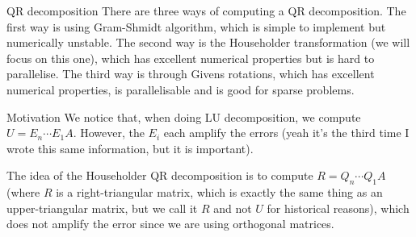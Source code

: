 \documentclass[a4paper]{article}
\begin{document}
\begin{parag}{QR decomposition}
    There are three ways of computing a QR decomposition. The first way is using Gram-Shmidt algorithm, which is simple to implement but numerically unstable. The second way is the Householder transformation (we will focus on this one), which has excellent numerical properties but is hard to parallelise. The third way is through Givens rotations, which has excellent numerical properties, is parallelisable and is good for sparse problems.
\end{parag}

\begin{parag}{Motivation}
    We notice that, when doing LU decomposition, we compute $U = E_n \cdots E_1 A$. However, the $E_i$ each amplify the errors (yeah it's the third time I wrote this same information, but it is important).

    The idea of the Householder QR decomposition is to compute $R = Q_n \cdots Q_1 A$ (where $R$ is a right-triangular matrix, which is exactly the same thing as an upper-triangular matrix, but we call it $R$ and not $U$ for historical reasons), which does not amplify the error since we are using orthogonal matrices.
\end{parag}
\end{document}
